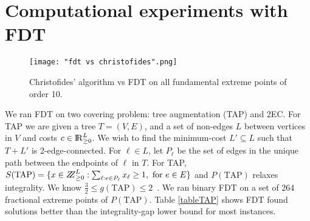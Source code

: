 \section{Computational experiments with FDT}\label{experiment}
\begin{figure}[h!]
\centering
\texttt{[image: "fdt vs christofides".png]}
\caption{Christofides' algorithm vs FDT on all fundamental extreme points of order 10.}
\label{fdtvschris}
\end{figure}

We ran FDT on two covering problem: tree augmentation (TAP) and 2EC. For TAP we are given a tree $T=(V,E)$, and a set of non-edges $L$ between vertices in $V$ and costs $c\in {\rm I\!R}^{L}_{\geq 0}$. We wish to find the minimum-cost  $L'\subseteq L$ such that $T+L'$ is 2-edge-connected. For $\ell\in L$, let $P_\ell$ be the set of edges in the unique path between the endpoints of $\ell$ in $T$. For TAP, $S(\mbox{TAP})=\{x\in \bbbz^{L}_{\geq 0}: \sum_{\ell: e\in P_\ell}x_\ell \geq 1, \mbox{ for $e\in E$}\}$ and $P(\mbox{TAP})$ relaxes integrality. We know $\frac{3}{2}\leq g({\mbox{TAP}})\leq 2$~\cite{fj,32gap}. We ran binary FDT on a set of 264 fractional extreme points of $P(\mbox{TAP})$. Table \ref{tableTAP} shows FDT found solutions better than the integrality-gap lower bound for most instances.


